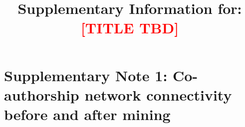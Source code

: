 \documentclass[pdflatex,sn-nature]{sn-jnl}%
\begin{document}
\title{Supplementary Information for: \textcolor{red}{[TITLE TBD]}}

\author*[1]{ }

\author[1]{ }


\maketitle



\section*{Supplementary Note 1: Co-authorship network connectivity before and after mining}\label{snote:network}


\end{document}
